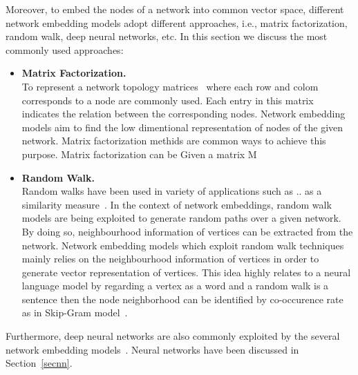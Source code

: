 Moreover, to embed the nodes of a network into common vector space, different network embedding models adopt different approaches, i.e., matrix factorization, random walk, deep neural networks, etc. In this section we discuss the most commonly used approaches:  
\begin{itemize}
\item \textbf{Matrix Factorization.}\\
To represent a network topology matrices~\cite{survey} where each row and colom corresponds to a node are commonly used. Each entry in this matrix indicates the relation between the corresponding nodes. Network embedding models aim to find the low dimentional representation of nodes of the given network. Matrix factorization methids are common ways to achieve this purpose. Matrix factorization can be Given a matrix M  
\item \textbf{Random Walk.}\\
Random walks have been used in variety of applications such as .. as a similarity measure~\cite{deewalk}. In the context of network embeddings, random walk models are being exploited to generate random paths over a given network. By doing so, neighbourhood information of vertices can be extracted from the network. Network embedding models which exploit random walk techniques mainly relies on the neighbourhood information of vertices in order to generate vector representation of vertices. This idea highly relates to a neural language model by regarding a vertex as a word and a random walk is a sentence then the node neighborhood can be identified by co-occurence rate as in Skip-Gram model~\cite{survey}.   

\end{itemize}
Furthermore, deep neural networks are also commonly exploited by the several network embedding models~\cite{}. Neural networks have been discussed in Section~\ref{secnn}.   


